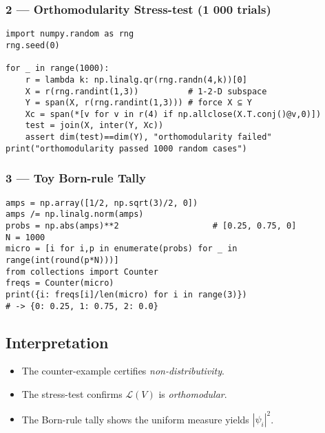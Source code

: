\documentclass[aps,prx,twocolumn]{revtex4-2}
\begin{document}
\begin{widetext}
\begin{appendix}
\subsubsection*{2 --- Orthomodularity Stress-test (1 000 trials)}
\begin{verbatim}
import numpy.random as rng
rng.seed(0)

for _ in range(1000):
    r = lambda k: np.linalg.qr(rng.randn(4,k))[0]
    X = r(rng.randint(1,3))          # 1-2-D subspace
    Y = span(X, r(rng.randint(1,3))) # force X ⊆ Y
    Xc = span(*[v for v in r(4) if np.allclose(X.T.conj()@v,0)])
    test = join(X, inter(Y, Xc))
    assert dim(test)==dim(Y), "orthomodularity failed"
print("orthomodularity passed 1000 random cases")
\end{verbatim}

\subsubsection*{3 --- Toy Born-rule Tally}
\begin{verbatim}
amps = np.array([1/2, np.sqrt(3)/2, 0])
amps /= np.linalg.norm(amps)
probs = np.abs(amps)**2                   # [0.25, 0.75, 0]
N = 1000
micro = [i for i,p in enumerate(probs) for _ in range(int(round(p*N)))]
from collections import Counter
freqs = Counter(micro)
print({i: freqs[i]/len(micro) for i in range(3)})
# -> {0: 0.25, 1: 0.75, 2: 0.0}
\end{verbatim}

\subsection*{Interpretation}
\begin{itemize}
    \item The counter-example certifies \emph{non-distributivity}.
    \item The stress-test confirms $\mathcal{L}(V)$ is \emph{orthomodular}.
    \item The Born-rule tally shows the uniform measure yields $|\psi_i|^2$.
\end{itemize}

\end{appendix}
\end{widetext}
\end{document}
